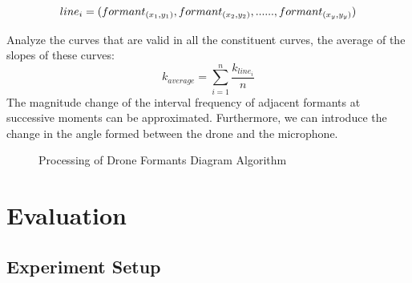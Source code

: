 \documentclass{sig-alternate-10pt}
\begin{document}
$$line_i=(formant_{(x_1,y_1)},formant_{(x_2,y_2)},......\\,formant_{(x_y,y_y)})$$



Analyze the curves that are valid in all the constituent curves, the average of the slopes of these curves:
$$k_{average}=\sum_{i=1}^n\frac{k_{{line}_i}}{n}$$
The magnitude change of the interval frequency of adjacent formants at successive moments can be approximated. Furthermore, we can introduce the change in the angle formed between the drone and the microphone.



\begin{figure}[t]
	\centering
	\caption{Processing of Drone Formants Diagram Algorithm}
	\label{formants}
\end{figure}


\section{Evaluation}
\subsection{Experiment Setup}
\end{document}
